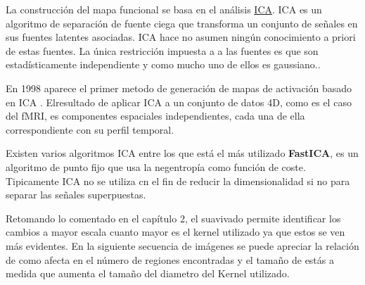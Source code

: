 La construcción del mapa funcional se basa en el análisis \hyperref[glos:ica]{ICA}. ICA es un algoritmo de separación de fuente ciega que transforma
un conjunto de señales en sus fuentes latentes asociadas. ICA hace no asumen ningún conocimiento a priori de estas fuentes. La única restricción impuesta a a las fuentes es que son estadísticamente independiente y como mucho uno de ellos es gaussiano.\cite{ica}.

En 1998 aparece el primer metodo de generación de mapas de activación basado en ICA \cite{fmriica}. Elresultado de aplicar ICA a un conjunto de datos 4D, como es el caso del fMRI, es componentes espaciales independientes, cada una de ella correspondiente con su perfil temporal.


Existen varios algoritmos ICA entre los que está el más utilizado \textbf{FastICA}, es un algoritmo de punto fijo que usa la negentropía como función de coste. Tipicamente ICA no se utiliza cn el fin de reducir la dimensionalidad si no para separar las señales superpuestas.



Retomando lo comentado en el capítulo 2, el suavivado permite identificar los cambios a mayor escala cuanto mayor es el kernel utilizado ya que estos se ven más evidentes. En la siguiente secuencia de imágenes se puede apreciar la relación de como afecta en el número de regiones encontradas y el tamaño de estás a medida que aumenta el tamaño del diametro del Kernel utilizado.

